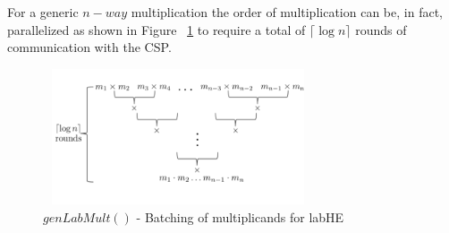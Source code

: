 For a generic $n-way$ multiplication the order of multiplication can be, in fact, parallelized as  shown in Figure ~\ref{genlab-fig} to require a total of $\lceil \log n\rceil$ rounds of communication with the \textsf{CSP}.
\begin{figure}\includegraphics[height=4cm,width=8cm]{kk.png} \caption{ $genLabMult()$ - Batching of multiplicands for \textsf{labHE}} \label{genlab-fig}\end{figure}\\


